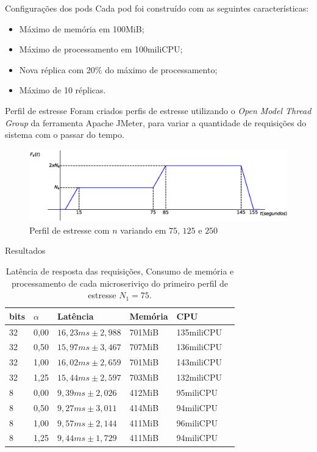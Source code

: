 \begin{frame}{Configurações dos pods}
    Cada pod foi construído com as seguintes características:
    \begin{itemize}
        \item Máximo de memória em 100MiB;
        \item Máximo de processamento em 100miliCPU;
        \item Nova réplica com 20\% do máximo de processamento;
        \item Máximo de 10 réplicas.
    \end{itemize}
\end{frame}

\begin{frame}{Perfil de estresse}
    Foram criados perfis de estresse utilizando o \textit{Open Model Thread Group} da ferramenta Apache JMeter, para variar a quantidade de requisições do sistema com o passar do tempo.
    \begin{figure}[H]
    \centering
    \includegraphics[width=1\textwidth]{figuras/estresse.eps}
    \caption{Perfil de estresse com $n$ variando em $75$, $125$ e $250$}
    \end{figure}
\end{frame}

\begin{frame}{Resultados}
    \scriptsize
    \begin{table}[H]
        \caption{\scriptsize{Latência de resposta das requisições, Consumo de memória e processamento de cada microseriviço do primeiro perfil de estresse $N_1 = 75$.}}
        \centering
        \begin{tabular}{llllll} \\
        \hline
        \textbf{bits} & \textbf{$\alpha$}  &  \textbf{Latência} & \textbf{Memória} &\textbf{CPU}\\  \hline
        32 &0,00& $16,23ms \pm 2,988$ & 701MiB & 135miliCPU\\
        32 &0,50& $15,97ms \pm 3,467$ & 707MiB & 136miliCPU\\
        32 &1,00& $16,02ms \pm 2,659$ & 701MiB & 143miliCPU\\
        32 &1,25& $15,44ms \pm 2,597$ & 703MiB & 132miliCPU\\
        8  &0,00& $9,39ms \pm 2,026$ & 412MiB & 95miliCPU\\
        8  &0,50& $9,27ms \pm 3,011$ & 414MiB & 94miliCPU\\
        8  &1,00& $9,57ms \pm 2,144$ & 411MiB & 96miliCPU\\
        8  &1,25& $9,44ms \pm 1,729$ & 411MiB & 94miliCPU\\
        \hline
        \end{tabular}
        \end{table}
\end{frame}

